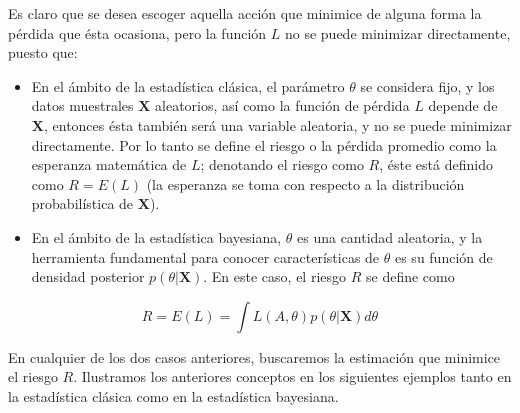 \documentclass[
  spanish,
  letter]{book}
\providecommand{\tightlist}{%
  \setlength{\itemsep}{0pt}\setlength{\parskip}{0pt}}
\theoremstyle{definition}
\theoremstyle{definition}
\theoremstyle{definition}
\theoremstyle{remark}
\begin{document}
Es claro que se desea escoger aquella acción que minimice de alguna forma la pérdida que ésta ocasiona, pero la función \(L\) no se puede minimizar directamente, puesto que:

\begin{itemize}
\tightlist
\item
  En el ámbito de la estadística clásica, el parámetro \(\theta\) se considera fijo, y los datos muestrales \(\mathbf{X}\) aleatorios, así como la función de pérdida \(L\) depende de \(\mathbf{X}\), entonces ésta también será una variable aleatoria, y no se puede minimizar directamente. Por lo tanto se define el riesgo o la pérdida promedio como la esperanza matemática de \(L\); denotando el riesgo como \(R\), éste está definido como \(R=E(L)\) (la esperanza se toma con respecto a la distribución probabilística de \(\mathbf{X}\)).
\item
  En el ámbito de la estadística bayesiana, \(\theta\) es una cantidad aleatoria, y la herramienta fundamental para conocer características de \(\theta\) es su función de densidad posterior \(p(\theta|\mathbf{X})\). En este caso, el riesgo \(R\) se define como
\end{itemize}

\begin{equation*}
R=E(L)=\int L(A, \theta)p(\theta|\mathbf{X})d\theta
\end{equation*}

En cualquier de los dos casos anteriores, buscaremos la estimación que minimice el riesgo \(R\). Ilustramos los anteriores conceptos en los siguientes ejemplos tanto en la estadística clásica como en la estadística bayesiana.
\end{document}
